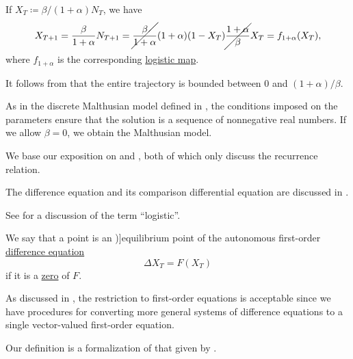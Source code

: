 \begin{comments}
  \item If \( X_T \coloneqq \beta / (1 + \alpha) N_T \), we have
  \begin{equation*}
    X_{T+1}
    =
    \frac \beta {1 + \alpha} N_{T+1}
    =
    \cancel{\frac \beta {1 + \alpha}} (1 + \alpha) (1 - X_T) \cancel{\frac {1 + \alpha} \beta} X_T
    =
    f_{1 + \alpha}(X_T),
  \end{equation*}
  where \( f_{1 + \alpha} \) is the corresponding \hyperref[def:logistic_map]{logistic map}.

  It follows from  that the entire trajectory is bounded between \( 0 \) and \( (1 + \alpha) / \beta \).

  \item As in the discrete Malthusian model defined in , the conditions imposed on the parameters ensure that the solution is a sequence of nonnegative real numbers. If we allow \( \beta = 0 \), we obtain the Malthusian model.

  \item We base our exposition on \cite[18]{Юмагулов2015ДинамическиеСистемы} and \cite[45]{EdelsteinKeshet2005MathematicalModelsInBiology}, both of which only discuss the recurrence relation.

  The difference equation and its comparison differential equation are discussed in \cite{MathSE:discrete_vs_continuous_logistic_model}.

  \item See  for a discussion of the term \enquote{logistic}.
\end{comments}

\begin{definition}\label{def:difference_equation_equilibrium_point}\mimprovised
  We say that a point is an \term[en=equilibrium points (\cite[15]{Elaydi2007DiscreteChaos})]{equilibrium point} of the autonomous first-order \hyperref[def:difference_equation]{difference equation}
  \begin{equation*}
    \Delta X_T = F(X_T)
  \end{equation*}
  if it is a \hyperref[def:zero_of_function]{zero} of \( F \).
\end{definition}
\begin{comments}
  \item As discussed in , the restriction to first-order equations is acceptable since we have procedures for converting more general systems of difference equations to a single vector-valued first-order equation.

  \item Our definition is a formalization of that given by .
\end{comments}

